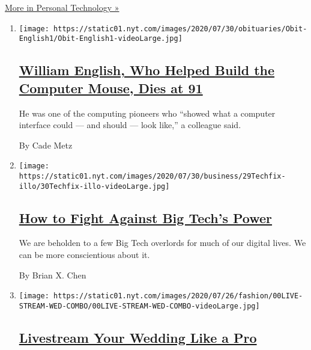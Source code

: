\href{/section/technology/personaltech}{More in Personal Technology »}

\begin{enumerate}
\def\labelenumi{\arabic{enumi}.}
\item
  \texttt{[image: https://static01.nyt.com/images/2020/07/30/obituaries/Obit-English1/Obit-English1-videoLarge.jpg]}

  \hypertarget{william-english-who-helped-build-the-computer-mouse-dies-at-91}{%
  \subsection{\texorpdfstring{\href{/2020/07/31/technology/william-english-who-helped-build-the-computer-mouse-dies-at-91.html}{William
  English, Who Helped Build the Computer Mouse, Dies at
  91}}{William English, Who Helped Build the Computer Mouse, Dies at 91}}\label{william-english-who-helped-build-the-computer-mouse-dies-at-91}}

  He was one of the computing pioneers who ``showed what a computer
  interface could --- and should --- look like,'' a colleague said.

  By Cade Metz
\item
  \texttt{[image: https://static01.nyt.com/images/2020/07/30/business/29Techfix-illo/30Techfix-illo-videoLarge.jpg]}

  \hypertarget{how-to-fight-against-big-techs-power}{%
  \subsection{\texorpdfstring{\href{/2020/07/29/technology/personaltech/big-tech-power-how-to-fight.html}{How
  to Fight Against Big Tech's
  Power}}{How to Fight Against Big Tech's Power}}\label{how-to-fight-against-big-techs-power}}

  We are beholden to a few Big Tech overlords for much of our digital
  lives. We can be more conscientious about it.

  By Brian X. Chen
\item
  \texttt{[image: https://static01.nyt.com/images/2020/07/26/fashion/00LIVE-STREAM-WED-COMBO/00LIVE-STREAM-WED-COMBO-videoLarge.jpg]}

  \hypertarget{livestream-your-wedding-like-a-pro}{%
  \subsection{\texorpdfstring{\href{/2020/07/28/fashion/weddings/livestream-your-wedding-like-a-pro.html}{Livestream
  Your Wedding Like a
  Pro}}{Livestream Your Wedding Like a Pro}}\label{livestream-your-wedding-like-a-pro}}


\end{enumerate}
